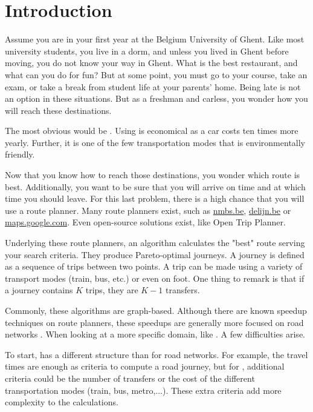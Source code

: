 \chapter{Introduction}
\label{chap:intro}
Assume you are in your first year at the Belgium University of Ghent. Like most university students, you live in a dorm, and unless you lived in Ghent before moving, you do not know your way in Ghent. What is the best restaurant, and what can you do for fun? But at some point, you must go to your course, take an exam, or take a break from student life at your parents' home. Being late is not an option in these situations. But as a freshman and carless, you wonder how you will reach these destinations.  

The most obvious would be . Using  is economical as a car costs ten times more yearly. Further, it is one of the few transportation modes that is environmentally friendly.

Now that you know how to reach those destinations, you wonder which route is best. Additionally, you want to be sure that you will arrive on time and at which time you should leave. 
For this last problem, there is a high chance that you will use a route planner. Many route planners exist, such as \url{nmbs.be}, \url{delijn.be} or \url{maps.google.com}. Even open-source solutions exist, like Open Trip Planner\cite{noauthor_otp_2023}.

Underlying these route planners, an algorithm calculates the "best" route serving your search criteria. They produce Pareto-optimal journeys. A journey is defined as a sequence of trips between two points. A trip can be made using a variety of transport modes (train, bus, etc.) or even on foot. One thing to remark is that if a journey contains $K$ trips, they are $K-1$ transfers. 

Commonly, these algorithms are graph-based. Although there are known speedup techniques on route planners, these speedups are generally more focused on road networks \cite{bast_car_2009}. When looking at a more specific domain, like . A few difficulties arise.

To start,  has a different structure than for road networks. For example, the travel times are enough as criteria to compute a road journey, but for , additional criteria could be the number of transfers or the cost of the different transportation modes (train, bus, metro,...). These extra criteria add more complexity to the calculations.

